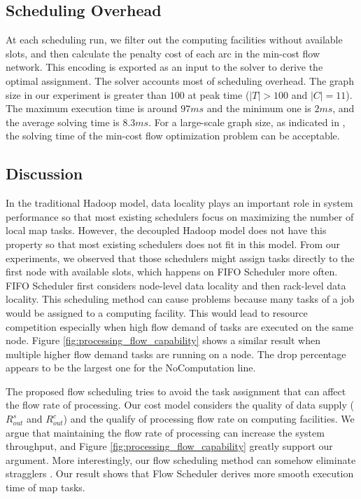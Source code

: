 \subsection{Scheduling Overhead}
At each scheduling run, we filter out the computing facilities without available slots, and then calculate the penalty cost of each arc in the min-cost flow network.
This encoding is exported as an input to the solver to derive the optimal assignment.
The solver accounts most of scheduling overhead.
The graph size in our experiment is greater than $100$ at peak time ($|T|>100$ and $|C|=11$).
The maximum execution time is around $97ms$ and the minimum one is $2ms$, and the average solving time is $8.3ms$.
For a large-scale graph size, as indicated in \cite{IsardM2009_Quincy}, the solving time of the min-cost flow optimization problem can be acceptable.

\subsection{Discussion}

In the traditional Hadoop model, data locality plays an important role in system performance so that most existing schedulers focus on maximizing the number of local map tasks.
However, the decoupled Hadoop model does not have this property so that most existing schedulers does not fit in this model.
From our experiments, we observed that those schedulers might assign tasks directly to the first node with available slots, which happens on FIFO Scheduler more often.
FIFO Scheduler first considers node-level data locality and then rack-level data locality.
This scheduling method can cause problems because many tasks of a job would be assigned to a computing facility.
This would lead to resource competition especially when high flow demand of tasks are executed on the same node.
Figure \ref{fig:processing_flow_capability} shows a similar result when multiple higher flow demand tasks are running on a node.
The drop percentage appears to be the largest one for the  NoComputation line.

The proposed flow scheduling tries to avoid the task assignment that can affect the flow rate of processing.
Our cost model considers the quality of data supply ($R^{s}_{out}$ and $R^{c}_{out}$) and the qualify of processing flow rate on computing facilities.
We argue that maintaining the flow rate of processing can increase the system throughput, and Figure \ref{fig:processing_flow_capability} greatly support our argument.
More interestingly, our flow scheduling method can somehow eliminate stragglers \cite{DeanJ2004_MapReduce, ZahariaM2008_LATE}. 
Our result shows that Flow Scheduler derives more smooth execution time of map tasks.

